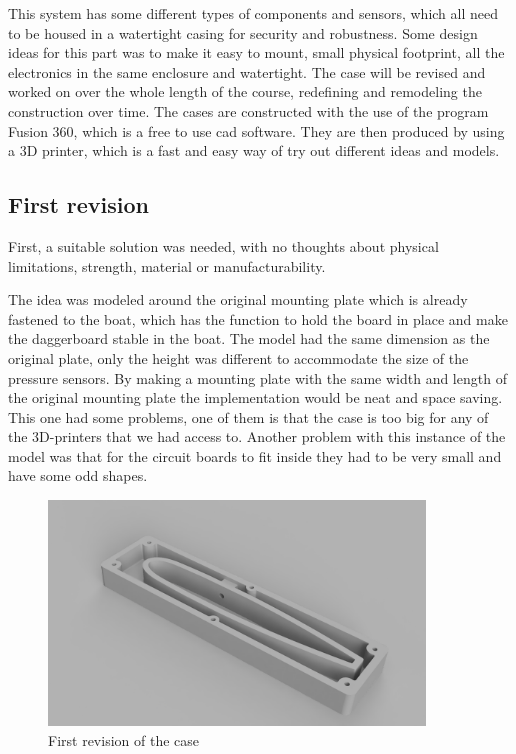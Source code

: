 
This system has some different types of components and sensors, which all need to be housed in a watertight casing for security and robustness. Some design ideas for this part was to make it easy to mount, small physical footprint, all the electronics in the same enclosure and watertight.  
The case will be revised and worked on over the whole length of the course, redefining and remodeling the construction over time.  
The cases are constructed with the use of the program Fusion 360, which is a free to use \gls{cad} software. They are then produced by using a 3D printer, which is a fast and easy way of try out different ideas and models.   

\subsection{First revision}
First, a suitable solution was needed, with no thoughts about physical limitations, strength, material or manufacturability.  

The idea was modeled around the original mounting plate which is already fastened to the boat, which has the function to hold the board in place and make the daggerboard stable in the boat. The model had the same dimension as the original plate, only the height was different to accommodate the size of the pressure sensors. By making a mounting plate with the same width and length of the original mounting plate the implementation would be neat and space saving. 
This one had some problems, one of them is that the case is too big for any of the 3D-printers that we had access to. Another problem with this instance of the model was that for the circuit boards to fit inside they had to be very small and have some odd shapes.  



\begin{figure}[H]
\begin{center}
	\includegraphics[width = 10cm]{Figures/Case_rev_1.png}
	\caption{First revision of the case}
	\label{Case_rev_1}
\end{center}
\end{figure}

